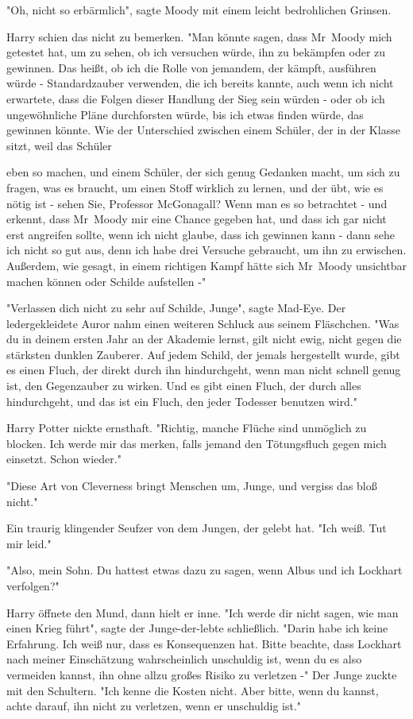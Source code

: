 {"Oh, nicht so erbärmlich", sagte Moody mit einem leicht bedrohlichen Grinsen.

Harry schien das nicht zu bemerken. "Man könnte sagen, dass Mr~Moody mich getestet hat, um zu sehen, ob ich versuchen würde, ihn zu bekämpfen oder zu gewinnen. Das heißt, ob ich die Rolle von jemandem, der kämpft, ausführen würde - Standardzauber verwenden, die ich bereits kannte, auch wenn ich nicht erwartete, dass die Folgen dieser Handlung der Sieg sein würden - oder ob ich ungewöhnliche Pläne durchforsten würde, bis ich etwas finden würde, das gewinnen könnte. Wie der Unterschied zwischen einem Schüler, der in der Klasse sitzt, weil das Schüler

eben so machen, und einem Schüler, der sich genug Gedanken macht, um sich zu fragen, was es braucht, um einen Stoff wirklich zu lernen, und der übt, wie es nötig ist - sehen Sie, Professor McGonagall? Wenn man es so betrachtet - und erkennt, dass Mr~Moody mir eine Chance gegeben hat, und dass ich gar nicht erst angreifen sollte, wenn ich nicht glaube, dass ich gewinnen kann - dann sehe ich nicht so gut aus, denn ich habe drei Versuche gebraucht, um ihn zu erwischen. Außerdem, wie gesagt, in einem richtigen Kampf hätte sich Mr~Moody unsichtbar machen können oder Schilde aufstellen -"

"Verlassen dich nicht zu sehr auf Schilde, Junge", sagte Mad-Eye. Der ledergekleidete Auror nahm einen weiteren Schluck aus seinem Fläschchen. "Was du in deinem ersten Jahr an der Akademie lernst, gilt nicht ewig, nicht gegen die stärksten dunklen Zauberer. Auf jedem Schild, der jemals hergestellt wurde, gibt es einen Fluch, der direkt durch ihn hindurchgeht, wenn man nicht schnell genug ist, den Gegenzauber zu wirken. Und es gibt einen Fluch, der durch alles hindurchgeht, und das ist ein Fluch, den jeder Todesser benutzen wird."

Harry Potter nickte ernsthaft. "Richtig, manche Flüche sind unmöglich zu blocken. Ich werde mir das merken, falls jemand den Tötungsfluch gegen mich einsetzt. Schon wieder."

"Diese Art von Cleverness bringt Menschen um, Junge, und vergiss das bloß nicht."

Ein traurig klingender Seufzer von dem Jungen, der gelebt hat. "Ich weiß. Tut mir leid."

"Also, mein Sohn. Du hattest etwas dazu zu sagen, wenn Albus und ich Lockhart verfolgen?"

Harry öffnete den Mund, dann hielt er inne. "Ich werde dir nicht sagen, wie man einen Krieg führt", sagte der Junge-der-lebte schließlich. "Darin habe ich keine Erfahrung. Ich weiß nur, dass es Konsequenzen hat. Bitte beachte, dass Lockhart nach meiner Einschätzung wahrscheinlich unschuldig ist, wenn du es also vermeiden kannst, ihn ohne allzu großes Risiko zu verletzen -" Der Junge zuckte mit den Schultern. "Ich kenne die Kosten nicht. Aber bitte, wenn du kannst, achte darauf, ihn nicht zu verletzen, wenn er unschuldig ist."

}
